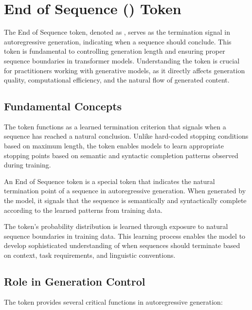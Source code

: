 
\section{End of Sequence (\eos{}) Token}

The End of Sequence token, denoted as \eos{}, serves as the termination signal in autoregressive generation, indicating when a sequence should conclude. This token is fundamental to controlling generation length and ensuring proper sequence boundaries in transformer models. Understanding the \eos{} token is crucial for practitioners working with generative models, as it directly affects generation quality, computational efficiency, and the natural flow of generated content.

\subsection{Fundamental Concepts}

The \eos{} token functions as a learned termination criterion that signals when a sequence has reached a natural conclusion. Unlike hard-coded stopping conditions based on maximum length, the \eos{} token enables models to learn appropriate stopping points based on semantic and syntactic completion patterns observed during training.

\begin{definition}
An End of Sequence token \eos{} is a special token that indicates the natural termination point of a sequence in autoregressive generation. When generated by the model, it signals that the sequence is semantically and syntactically complete according to the learned patterns from training data.
\end{definition}

The \eos{} token's probability distribution is learned through exposure to natural sequence boundaries in training data. This learning process enables the model to develop sophisticated understanding of when sequences should terminate based on context, task requirements, and linguistic conventions.

\subsection{Role in Generation Control}

The \eos{} token provides several critical functions in autoregressive generation:

